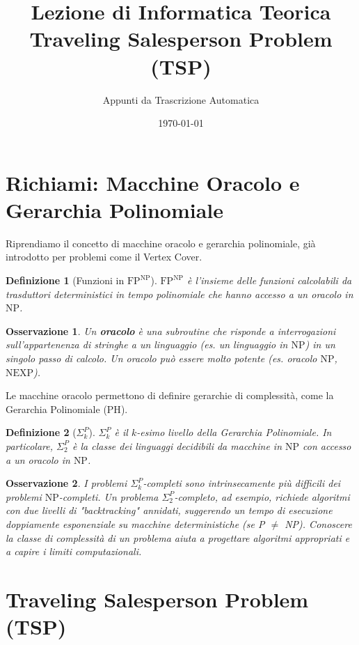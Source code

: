\documentclass[a4paper]{article}
\title{Lezione di Informatica Teorica\\{\Large Traveling Salesperson Problem (TSP)}}
\author{Appunti da Trascrizione Automatica}
\date{\today}
\newtheorem{definition}{Definizione}
\newtheorem{remark}{Osservazione}
\begin{document}
\maketitle
\tableofcontents
\newpage

\section{Richiami: Macchine Oracolo e Gerarchia Polinomiale}

Riprendiamo il concetto di macchine oracolo e gerarchia polinomiale, già introdotto per problemi come il Vertex Cover.

\begin{definition}[Funzioni in $\text{FP}^{\text{NP}}$]
$\text{FP}^{\text{NP}}$ è l'insieme delle funzioni calcolabili da trasduttori deterministici in tempo polinomiale che hanno accesso a un oracolo in $\text{NP}$.
\end{definition}

\begin{remark}
Un \textbf{oracolo} è una subroutine che risponde a interrogazioni sull'appartenenza di stringhe a un linguaggio (es. un linguaggio in $\text{NP}$) in un singolo passo di calcolo. Un oracolo può essere molto potente (es. oracolo $\text{NP}$, $\text{NEXP}$).
\end{remark}

Le macchine oracolo permettono di definire gerarchie di complessità, come la Gerarchia Polinomiale ($\text{PH}$).
\begin{definition}[$\Sigma_k^P$]
$\Sigma_k^P$ è il $k$-esimo livello della Gerarchia Polinomiale. In particolare, $\Sigma_2^P$ è la classe dei linguaggi decidibili da macchine in $\text{NP}$ con accesso a un oracolo in $\text{NP}$.
\end{definition}

\begin{remark}
I problemi $\Sigma_k^P$-completi sono intrinsecamente più difficili dei problemi $\text{NP}$-completi. Un problema $\Sigma_2^P$-completo, ad esempio, richiede algoritmi con due livelli di "backtracking" annidati, suggerendo un tempo di esecuzione doppiamente esponenziale su macchine deterministiche (se P $\neq$ NP). Conoscere la classe di complessità di un problema aiuta a progettare algoritmi appropriati e a capire i limiti computazionali.
\end{remark}

\section{Traveling Salesperson Problem (TSP)}
\end{document}

